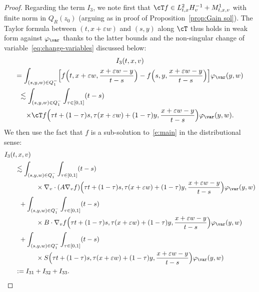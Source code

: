 \begin{proof}
Regarding the term $I_3$, we note first that
$\cT f \in L^2_{t,x} H^{-1}_v + M^1_{t,x,v}$ with finite norm
in $Q_R(z_0)$ (arguing as in proof of
Proposition~\ref{prop:Gain sol}). The Taylor formula between
$(t,x+\varepsilon w)$ and $(s,y)$ along $\cT$ thus holds in
weak form against $\varphi_\var$ thanks to the latter bounds
and the non-singular change of
variable~\eqref{eq:change-variables} discussed below:\vspace*{-5pt}
\begin{multline}\label{eq:Taylor-weak}
I_3(t,x,v)\\
= \int_{(s,y,w)\in Q_1^{-}} \Bigl[
f\Bigl(t,x+\varepsilon w,\frac{x+\varepsilon w
-y}{t-s}\Bigr)-f\Bigl(s,y,\frac{x+\varepsilon w
-y}{t-s}\Bigr)\Bigr] \varphi_\var(y,w)\\
\shoveleft{\hspace*{-1mm}\lesssim \int_{(s,y,w)\in Q_1^{-}} \int_{\tau \in
[0,1]} (t-s)}\\
\times \cT
f\Bigl(\tau t+(1-\tau)s,\tau (x+\varepsilon
w)+(1-\tau)y,\frac{x+\varepsilon w
-y}{t-s}\Bigr)\varphi_\var(y,w).
\end{multline}
We then use the fact that $f$ is a sub-solution
to~\eqref{e:main} in the distributional sense:\vspace*{-5pt}
\begin{align*}
I_3(t&,x,v)\\
&\lesssim \int_{(s,y,w)\in Q_1^{-}} \int_{\tau \in
[0,1]} (t-s) \\
&\hspace*{1.1cm}\times \nabla_v \cdot (A \nabla_v f)\Bigl(\tau
t+(1-\tau)s,\tau (x+\varepsilon
w)+(1-\tau)y,\frac{x+\varepsilon w
-y}{t-s}\Bigr)\varphi_\var(y,w)\\
&\hspace*{.2cm}+\int_{(s,y,w)\in Q_1^{-}} \int_{\tau \in
[0,1]} (t-s) \\
&\hspace*{1.1cm}\times
B\cdot \nabla_v f\Bigl(\tau t+(1-\tau)s,\tau
(x+\varepsilon w)+(1-\tau)y,\frac{x+\varepsilon w
-y}{t-s}\Bigr)\varphi_\var(y,w)\\
&\hspace*{.2cm}+ \int_{(s,y,w)\in Q_1^{-}} \int_{\tau \in
[0,1]} (t-s) \\
&\hspace*{1.1cm}\times S\Bigl(\tau t+(1-\tau)s,\tau (x+\varepsilon
w)+(1-\tau)y,\frac{x+\varepsilon w
-y}{t-s}\Bigr)\varphi_\var(y,w)\\
&:= I_{31}+I_{32}+I_{33}.
\end{align*}

\end{proof}
